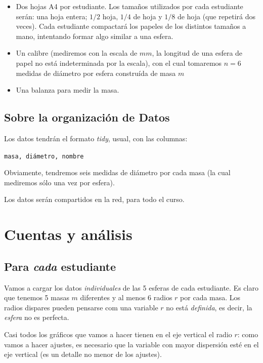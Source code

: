 \documentclass[10pt,a4paper]{article}
\numberwithin{equation}{section}
\begin{document}
\begin{itemize}
\item[$\bullet$] Dos hojas A4 por estudiante. Los tamaños utilizados por cada estudiante serán: una hoja entera; $1/2$ hoja, $1/4$ de hoja y $1/8$ de hoja (que repetirá dos veces). Cada estudiante compactará los papeles de los distintos tamaños a mano, intentando formar algo similar a una esfera.
\item[$\bullet$] Un calibre (mediremos con la escala de $mm$, la longitud de una esfera de papel no está indeterminada por la escala), con el cual tomaremos $n = 6$ medidas de diámetro por esfera construída de masa $m$
\item[$\bullet$] Una balanza para medir la masa.
\end{itemize}

\subsection{Sobre la organización de Datos}

Los datos tendrán el formato \textit{tidy}, usual, con las columnas:

\noindent \texttt{masa, diámetro, nombre}

Obviamente, tendremos seis medidas de diámetro por cada masa (la cual mediremos sólo una vez por esfera).

Los datos serán compartidos en la red, para todo el curso.

\section{Cuentas y análisis}



\subsection*{Para \textit{cada} estudiante}

Vamos a cargar los datos \textit{individuales} de las 5 esferas de cada estudiante. Es claro que tenemos 5 masas $m$ diferentes y al menos 6 radios $r$ por cada masa. Los radios dispares pueden pensarse com una variable $r$ no está \textit{definida}, es decir, la \textit{esfera} no es perfecta.

Casi todos los gráficos que vamos a hacer tienen en el eje vertical el radio $r$: como vamos a hacer ajustes, es necesario que la variable con mayor dispersión esté en el eje vertical (es un detalle no menor de los ajustes).
\end{document}
